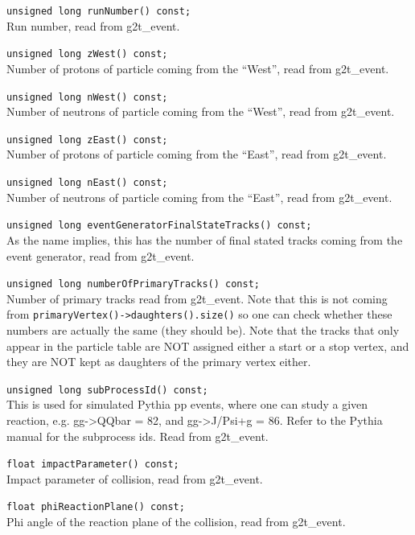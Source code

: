 \begin{Entry}
    \verb+unsigned long runNumber() const;+\\
    Run number, read from g2t\_event.

    \verb+unsigned long zWest() const;+\\
    Number of protons of particle coming from the ``West'', read from g2t\_event.

    \verb+unsigned long nWest() const;+\\
    Number of neutrons of particle coming from the ``West'', read from g2t\_event.

    \verb+unsigned long zEast() const;+\\
    Number of protons of particle coming from the ``East'', read from g2t\_event.

    \verb+unsigned long nEast() const;+\\
    Number of neutrons of particle coming from the ``East'', read from g2t\_event.

    \verb+unsigned long eventGeneratorFinalStateTracks() const;+\\
    As the name implies, this has the number of final stated tracks coming
    from the event generator, read from g2t\_event.

    \verb+unsigned long numberOfPrimaryTracks() const;+\\
    Number of primary tracks read from g2t\_event.  Note that this is
    not coming from {\tt primaryVertex()->daughters().size()} so one
    can check whether these numbers are actually the same (they should be).  Note
    that the tracks that only appear in the particle table are NOT assigned
    either a start or a stop vertex, and they are NOT kept as daughters
    of the primary vertex either.

    \verb+unsigned long subProcessId() const;+\\
    This is used for simulated Pythia pp events, where
    one can study a given reaction, e.g. gg->QQbar = 82, and
    gg->J/Psi+g = 86. Refer to the Pythia manual for the
    subprocess ids.  Read from g2t\_event.

    \verb+float impactParameter() const;+\\
    Impact parameter of collision, read from g2t\_event.

    \verb+float phiReactionPlane() const;+\\
    Phi angle of the reaction plane of the collision, read from g2t\_event.


\end{Entry}
